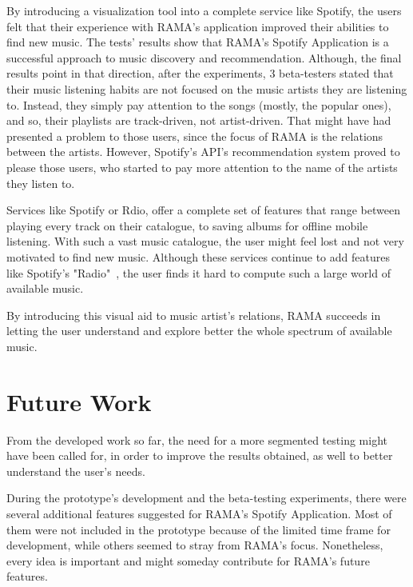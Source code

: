   By introducing a visualization tool into a complete service like Spotify, the users felt that their experience with RAMA's application improved their abilities to find new music.
  The tests' results show that RAMA's Spotify Application is a successful approach to music discovery and recommendation.
  Although, the final results point in that direction, after the experiments, 3 beta-testers stated that their music listening habits are not focused on the music artists they are listening to. Instead, they simply pay attention to the songs (mostly, the popular ones), and so, their playlists are track-driven, not artist-driven.
  That might have had presented a problem to those users, since the focus of RAMA is the relations between the artists.
  However, Spotify's API's recommendation system proved to please those users, who started to pay more attention to the name of the artists they listen to.

  Services like Spotify or Rdio, offer a complete set of features that range between playing every track on their catalogue, to saving albums for offline mobile listening.
  With such a vast music catalogue, the user might feel lost and not very motivated to find new music.
  Although these services continue to add features like Spotify's "Radio"~\cite{spradio}, the user finds it hard to compute such a large world of available music.

  By introducing this visual aid to music artist's relations, RAMA succeeds in letting the user understand and explore better the whole spectrum of available music.


\section{Future Work} %
\label{sec:future_work}

  From the developed work so far, the need for a more segmented testing might have been called for, in order to improve the results obtained, as well to better understand the user's needs.

  During the prototype's development and the beta-testing experiments, there were several additional features suggested for RAMA's Spotify Application.
  Most of them were not included in the prototype because of the limited time frame for development, while others seemed to stray from RAMA's focus.
  Nonetheless, every idea is important and might someday contribute for RAMA's future features.


